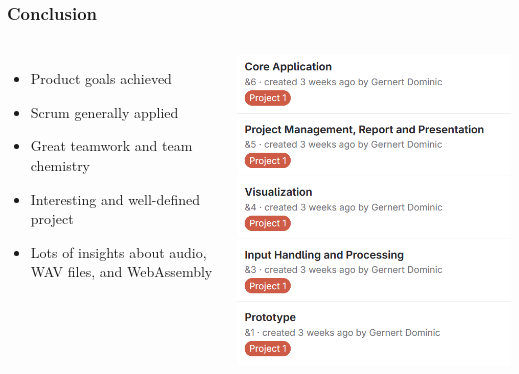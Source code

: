 \begin{frame}
    \frametitle{Conclusion}
    \begin{columns}
        \begin{itemize}
            \large
            \item Product goals achieved
            \item Scrum generally applied
            \item Great teamwork and team chemistry
            \item Interesting and well-defined project
            \item Lots of insights about audio, WAV files, and WebAssembly
        \end{itemize}
        \includegraphics[width=0.8\linewidth]{../assets/epics_interim_presentation.png}
    \end{columns}
\end{frame}

